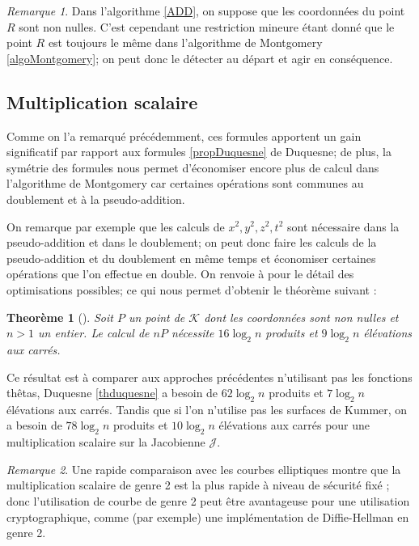 \documentclass[a4paper,12pt]{article}
\newtheorem{theoreme}{Theorème}[section]
\theoremstyle{definition}
\theoremstyle{remark}
\newtheorem{remarque}{Remarque}
\numberwithin{equation}{section}
\begin{document}
\begin{remarque}
Dans l'algorithme \ref{ADD}, on suppose que les coordonnées du point $R$ sont non nulles. C'est cependant une restriction mineure étant donné que le point $R$ est toujours le même dans l'algorithme de Montgomery \ref{algoMontgomery}; on peut donc le détecter au départ et agir en conséquence.
\end{remarque}

\subsection{Multiplication scalaire}

Comme on l'a remarqué précédemment, ces formules apportent un gain significatif par rapport aux formules \ref{propDuquesne} de Duquesne; de plus, la symétrie des formules nous permet d'économiser encore plus de calcul dans l'algorithme de Montgomery car certaines opérations sont communes au doublement et à la pseudo-addition.

On remarque par exemple que les calculs de $x^2,y^2,z^2,t^2$ sont nécessaire dans la pseudo-addition et dans le doublement; on peut donc faire les calculs de la pseudo-addition et du doublement en même temps et économiser certaines opérations que l'on effectue en double. On renvoie à \citep{gaudry} pour le détail des optimisations possibles; ce qui nous permet d'obtenir le théorème suivant :
\begin{theoreme}[\citet{gaudry}]
\label{mulscal}
Soit $P$ un point de $\mathcal{K}$ dont les coordonnées sont non nulles et $n > 1$ un entier. Le calcul de $nP$ nécessite $16\log_2 n$ produits et $9\log_2 n$ élévations aux carrés.
\end{theoreme}

Ce résultat est à comparer aux approches précédentes n'utilisant pas les fonctions thêtas, Duquesne \ref{thduquesne} a besoin de $62\log_2 n$ produits et $7\log_2 n$ élévations aux carrés. Tandis que si l'on n'utilise pas les surfaces de Kummer, on a besoin de $78\log_2 n$ produits et $10\log_2 n$ élévations aux carrés pour une multiplication scalaire sur la Jacobienne $\mathcal{J}$.

\begin{remarque}
Une rapide comparaison avec les courbes elliptiques montre que la multiplication scalaire de genre 2 est la plus rapide à niveau de sécurité fixé \citep[5.5]{gaudry}; donc l'utilisation de courbe de genre 2 peut être avantageuse pour une utilisation cryptographique, comme (par exemple) une implémentation de Diffie-Hellman en genre 2.
\end{remarque}
\end{document}
